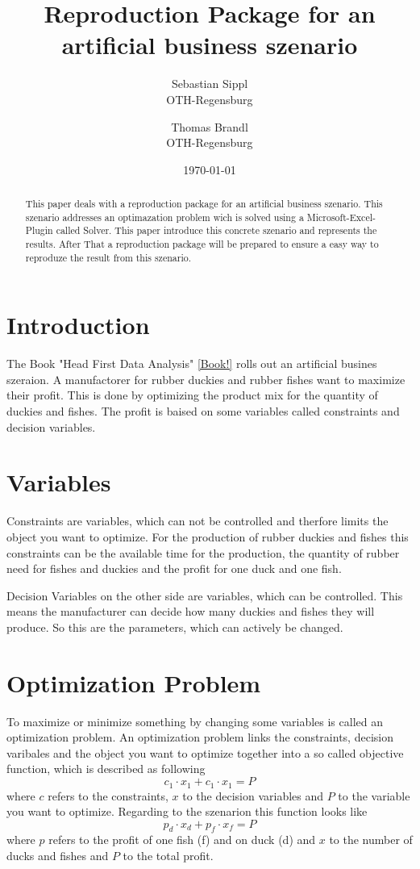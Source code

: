 \documentclass{article}
\title{\textbf{Reproduction Package for an artificial business szenario}}
\author{Sebastian Sippl  \\
	OTH-Regensburg  \\
	\and 
	Thomas Brandl \\
	OTH-Regensburg  \\
	}
\date{\today}
\begin{document}
\maketitle


\begin{abstract}
This paper deals with a reproduction package for an artificial business szenario. This szenario addresses an optimazation problem wich is solved using a Microsoft-Excel-Plugin called Solver. This paper introduce this concrete szenario and represents the results. After That a reproduction package will be prepared to ensure a easy way to reproduze the result from this szenario.
\end{abstract}

\begin{multicols}{2}

\section{Introduction}
The Book "Head First Data Analysis" \ref{Book!} rolls out an artificial busines szeraion. A manufactorer for rubber duckies and rubber fishes want to maximize their profit. This is done by optimizing the product mix for the quantity of duckies and fishes. The profit is baised on some variables called constraints and decision variables. 

\section{Variables}
Constraints are variables, which can not be controlled and therfore limits the object you want to optimize. For the production of rubber duckies and fishes this constraints can be the available time for the production, the quantity of rubber need for fishes and duckies and the profit for one duck and one fish.

Decision Variables on the other side are variables, which can be controlled. This means the manufacturer can decide how many duckies and fishes they will produce. So this are the parameters, which can actively be changed. 


\section{Optimization Problem}
To maximize or minimize something by changing some variables is called an optimization problem. An optimization problem links the constraints, decision varibales and the object you want to optimize together into a so called objective function, which is described as following
\begin{equation}
c_{1}\cdot x_{1} + c_{1}\cdot x_{1} = P
\end{equation}
where $c$ refers to the constraints, $x$ to the decision variables and $P$ to the variable you want to optimize. Regarding to the szenarion this function looks like 
\begin{equation}
p_{d}\cdot x_{d} + p_{f}\cdot x_{f} = P
\end{equation}
where $p$ refers to the profit of one fish (f) and on duck (d) and $x$ to the number of ducks and fishes and $P$ to the total profit.


\end{multicols}
\end{document}
